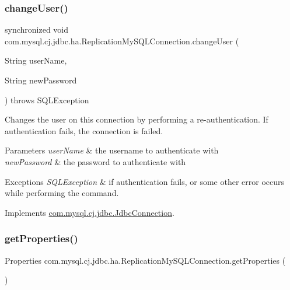 \subsubsection{\texorpdfstring{change\+User()}{changeUser()}}
{\footnotesize\ttfamily synchronized void com.\+mysql.\+cj.\+jdbc.\+ha.\+Replication\+My\+S\+Q\+L\+Connection.\+change\+User (\begin{DoxyParamCaption}\item[{String}]{user\+Name,  }\item[{String}]{new\+Password }\end{DoxyParamCaption}) throws S\+Q\+L\+Exception}

Changes the user on this connection by performing a re-\/authentication. If authentication fails, the connection is failed.


\begin{DoxyParams}{Parameters}
{\em user\+Name} & the username to authenticate with \\
\hline
{\em new\+Password} & the password to authenticate with \\
\hline
\end{DoxyParams}

\begin{DoxyExceptions}{Exceptions}
{\em S\+Q\+L\+Exception} & if authentication fails, or some other error occurs while performing the command. \\
\hline
\end{DoxyExceptions}


Implements \mbox{\hyperlink{interfacecom_1_1mysql_1_1cj_1_1jdbc_1_1_jdbc_connection_aed0496e0f2c1236f2784f92b45a482ef}{com.\+mysql.\+cj.\+jdbc.\+Jdbc\+Connection}}.

\mbox{\label{classcom_1_1mysql_1_1cj_1_1jdbc_1_1ha_1_1_replication_my_s_q_l_connection_a04a60b0695519e98a4827f90161f52da}} 
\subsubsection{\texorpdfstring{get\+Properties()}{getProperties()}}
{\footnotesize\ttfamily Properties com.\+mysql.\+cj.\+jdbc.\+ha.\+Replication\+My\+S\+Q\+L\+Connection.\+get\+Properties (\begin{DoxyParamCaption}{ }\end{DoxyParamCaption})}

